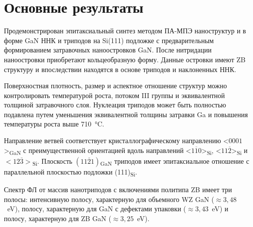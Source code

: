 \section{Основные результаты}\label{sec:ch3/sec7}

Продемонстрирован эпитаксиальный синтез методом ПА-МПЭ наноструктур и в форме
GaN ННК и триподов на Si(111) подложке с предварительным формированием
затравочных наноостровков GaN. После нитридации наноостровки приобретают
кольцеобразную форму. Данные островки имеют ZB структуру и впоследствии
находятся в основе триподов и наклоненных ННК.

Поверхностная плотность, размер и аспектное отношение структур можно
контролировать температурой роста, потоком III группы и эквивалентной толщиной
затравочного слоя. Нуклеация триподов может быть полностью подавлена путем
уменьшения эквивалентной толщины затравки Ga и повышения температуры роста выше
710~\si{\degreeCelsius}.

Направление ветвей соответствует кристаллографическому направлению
<\(0001\)>\textsubscript{GaN} с преимущественной ориентацией вдоль направлений
<\(1\overline{1}0\)>\textsubscript{Si}, <\(11\overline{2}\)>\textsubscript{Si}
и \(<12\overline{3}>\)\textsubscript{Si}. Плоскость
\((11\overline{2}1)\)\textsubscript{GaN} триподов имеет эпитаксиальное
отношение с параллельной плоскостью подложки (111)\textsubscript{Si}.

Спектр ФЛ от массив нанотриподов с включениями политипа ZB имеет три полосы:
интенсивную полосу, характерную для объемного WZ GaN (\(\approx
3,48\)~\si{\electronvolt}), полосу, характерную для GaN с дефектами упаковки
(\(\approx 3,43\)~\si{\electronvolt}) и полосу, характерную для ZB GaN
(\(\approx 3,25\)~\si{\electronvolt}).

\FloatBarrier
